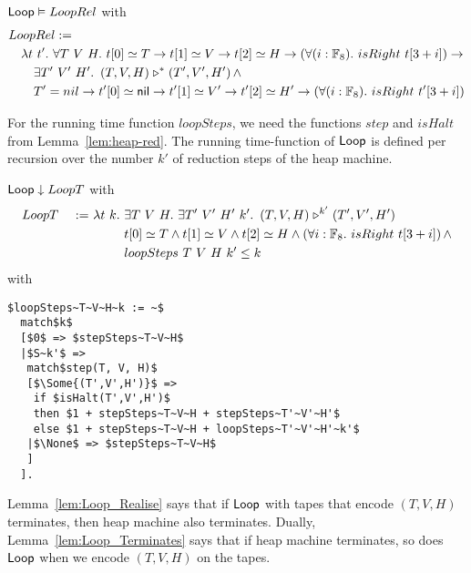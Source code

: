\begin{lemma}
  \label{lem:Loop_Realise}
  $\mathsf{Loop} \mathrel{\vDash} LoopRel$ with
  \begin{alignat*}{1}
    & LoopRel := \\
    &\quad \lambda t~t'.~\forall T~V~H.~ t[0] \simeq T \rightarrow t[1] \simeq V \rightarrow t[2] \simeq H \rightarrow \left(\forall (i:\mathbb{F}_8).~isRight~t[3+i]\right) \rightarrow \\
    &\qquad \exists T'~V'~H'.~ \left(T,V,H\right) \mathrel{\triangleright}^* \left(T',V',H'\right) \land \\ 
    &\qquad T' = nil \rightarrow t'[0] \simeq \mathsf{nil} \rightarrow t'[1] \simeq V' \rightarrow t'[2] \simeq H' \rightarrow \left(\forall (i:\mathbb{F}_8).~isRight~t'[3+i]\right)
  \end{alignat*}
\end{lemma}

For the running time function $loopSteps$, we need the functions $step$ and $isHalt$ from Lemma~\ref{lem:heap-red}.  The running time-function of
$\mathsf{Loop}$ is defined per recursion over the number $k'$ of reduction steps of the heap machine.
\begin{lemma}
  \label{lem:Loop_Terminates}
  $\mathsf{Loop} \mathrel{\downarrow} LoopT$ with
  \begin{alignat*}{2}
    &LoopT &~:=~& \lambda t~k.~\exists T~V~H.~\exists T'~V'~H'~k'.~ \left(T,V,H\right) \mathrel{\triangleright}^{k'} \left(T',V',H'\right) \\
    &      &    & \phantom{\lambda t~k.}~t[0] \simeq T \land t[1] \simeq V \land t[2] \simeq H \land \left(\forall i:\mathbb{F}_8.~isRight~t[3+i]\right) \land \\
    &      &    & \phantom{\lambda t~k.}~loopSteps~T~V~H~k' \leq k
  \end{alignat*}
  with
  \small
\begin{lstlisting}[style=semicoqstyle]
$loopSteps~T~V~H~k := ~$
  match$k$
  [$0$ => $stepSteps~T~V~H$
  |$S~k'$ =>
   match$step(T, V, H)$
   [$\Some{(T',V',H')}$ =>
    if $isHalt(T',V',H')$
    then $1 + stepSteps~T~V~H + stepSteps~T'~V'~H'$
    else $1 + stepSteps~T~V~H + loopSteps~T'~V'~H'~k'$
   |$\None$ => $stepSteps~T~V~H$
   ]
  ].
\end{lstlisting}
\end{lemma}

Lemma~\ref{lem:Loop_Realise} says that if $\mathsf{Loop}$ with tapes that encode $(T,V,H)$ terminates, then heap machine also terminates.  Dually,
Lemma~\ref{lem:Loop_Terminates} says that if heap machine terminates, so does $\mathsf{Loop}$ when we encode $(T,V,H)$ on the tapes.

